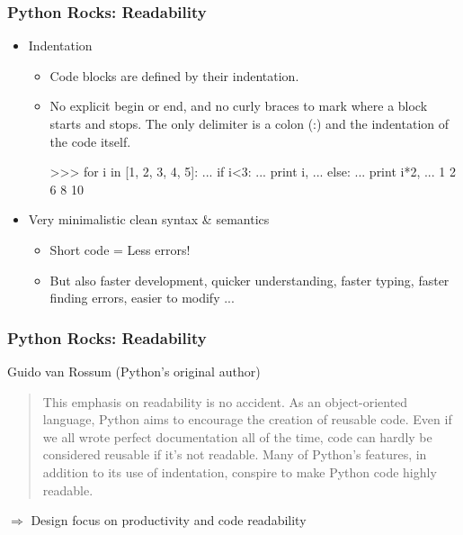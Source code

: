 \documentclass[t,10pt,compress=false,usepdftitle=false]{beamer}
\begin{document}
\begin{frame}[fragile]
    \frametitle{Python Rocks: Readability}
    \begin{itemize}
        \item Indentation
            \begin{itemize}
                \item Code blocks are defined by their indentation.
                \item No explicit begin or end, and no curly braces to mark where a block starts and stops. The only delimiter is a colon (:) and the indentation of the code itself.
                \pause
                \begin{myColorBox}{0.8}{}
\begin{semiverbatim}
>>> for i in [1, 2, 3, 4, 5]:
...    if i<3:
...        print i,
...    else:
...        print i*2,
...
1 2 6 8 10
\end{semiverbatim}
                \end{myColorBox}
        \end{itemize}
        \pause
        \item Very minimalistic clean syntax \& semantics
            \begin{itemize}
                \item Short code = Less errors!
                \item But also faster development, quicker understanding, faster typing, faster finding errors, easier to modify ...
            \end{itemize}
        \end{itemize}
\end{frame}

\begin{frame}[fragile]
    \frametitle{Python Rocks: Readability}
    Guido van Rossum (Python's original author)
        \begin{quote}
This emphasis on readability is no accident. As an object-oriented language, Python aims to encourage the creation of reusable code. Even if we all wrote perfect documentation all of the time, code can hardly be considered reusable if it's not readable. Many of Python’s features, in addition to its use of indentation, conspire to make Python code highly readable.
    \end{quote}
    \pause
    $\Longrightarrow$ Design focus on productivity and code readability
\end{frame}
\end{document}
